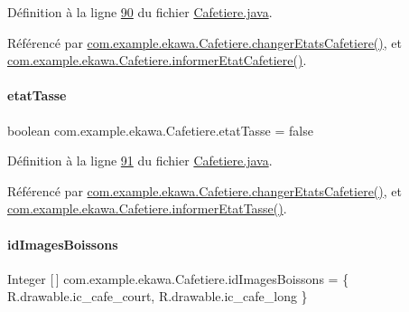 Définition à la ligne \hyperlink{_cafetiere_8java_source_l00090}{90} du fichier \hyperlink{_cafetiere_8java_source}{Cafetiere.\+java}.



Référencé par \hyperlink{_cafetiere_8java_source_l00636}{com.\+example.\+ekawa.\+Cafetiere.\+changer\+Etats\+Cafetiere()}, et \hyperlink{_cafetiere_8java_source_l00255}{com.\+example.\+ekawa.\+Cafetiere.\+informer\+Etat\+Cafetiere()}.

\mbox{\label{classcom_1_1example_1_1ekawa_1_1_cafetiere_a93c5021591facf06397e760c11556904}} 
\paragraph{\texorpdfstring{etat\+Tasse}{etatTasse}}
{\footnotesize\ttfamily boolean com.\+example.\+ekawa.\+Cafetiere.\+etat\+Tasse = false\hspace{0.3cm}{\ttfamily [private]}}



Définition à la ligne \hyperlink{_cafetiere_8java_source_l00091}{91} du fichier \hyperlink{_cafetiere_8java_source}{Cafetiere.\+java}.



Référencé par \hyperlink{_cafetiere_8java_source_l00636}{com.\+example.\+ekawa.\+Cafetiere.\+changer\+Etats\+Cafetiere()}, et \hyperlink{_cafetiere_8java_source_l00285}{com.\+example.\+ekawa.\+Cafetiere.\+informer\+Etat\+Tasse()}.

\mbox{\label{classcom_1_1example_1_1ekawa_1_1_cafetiere_a10645115a166d3529e63aeb4ea16a869}} 
\paragraph{\texorpdfstring{id\+Images\+Boissons}{idImagesBoissons}}
{\footnotesize\ttfamily Integer \mbox{[}$\,$\mbox{]} com.\+example.\+ekawa.\+Cafetiere.\+id\+Images\+Boissons = \{ R.\+drawable.\+ic\+\_\+cafe\+\_\+court, R.\+drawable.\+ic\+\_\+cafe\+\_\+long \}\hspace{0.3cm}{\ttfamily [private]}}



